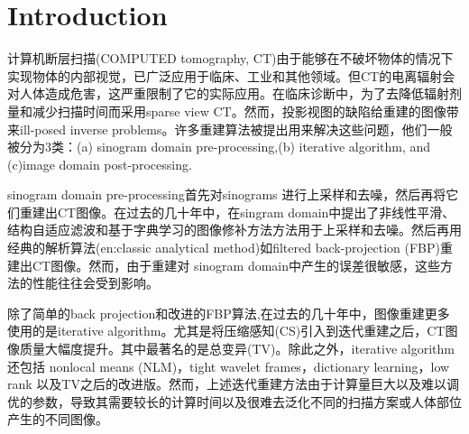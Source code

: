 \section{Introduction}
计算机断层扫描(COMPUTED tomography, CT)由于能够在不破坏物体的情况下实现物体的内部视觉，已广泛应用于临床、工业和其他领域\cite{2018Deep}。但CT的电离辐射会对人体造成危害\cite{2012Hall}，这严重限制了它的实际应用。在临床诊断中，为了去降低辐射剂量和减少扫描时间而采用sparse view CT。然而，投影视图的缺陷给重建的图像带来ill-posed inverse problems\cite{1989Incomplete}。许多重建算法被提出用来解决这些问题，他们一般被分为3类：(a) sinogram domain pre-processing,(b) iterative algorithm, and (c)image domain post-processing.\par

sinogram domain pre-processing首先对sinograms 进行上采样和去噪，然后再将它们重建出CT图像。在过去的几十年中，在singram domain中提出了非线性平滑\cite{2004Nonlinear}、结构自适应滤波\cite{2012Ray}和基于字典学习的图像修补方法\cite{2014Dictionary}方法用于上采样和去噪。然后再用经典的解析算法(en:classic analytical method)如filtered back-projection (FBP)\cite{kak2001principles}重建出CT图像。然而，由于重建对 sinogram domain中产生的误差很敏感，这些方法的性能往往会受到影响。\par

除了简单的back projection和改进的FBP算法,在过去的几十年中，图像重建更多使用的是iterative algorithm。尤其是将压缩感知(CS)\cite{2006Robust}\cite{2006Donoho}引入到迭代重建之后，CT图像质量大幅度提升。其中最著名的是总变异(TV)\cite{2008Image}。除此之外，iterative algorithm还包括 nonlocal means (NLM)\cite{2009Bayesian}，tight wavelet frames\cite{2011Multi}，dictionary learning\cite{2012Low,2019Convolutional}，low rank\cite{2014Cine} 以及TV之后的改进版\cite{2014Sparse,2016Statistical,2013Few}。然而，上述迭代重建方法由于计算量巨大以及难以调优的参数，导致其需要较长的计算时间以及很难去泛化不同的扫描方案或人体部位产生的不同图像。\par

